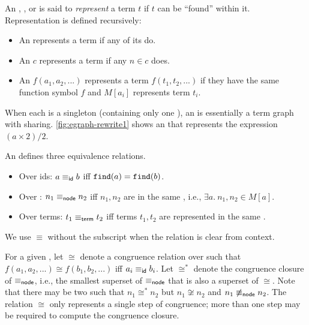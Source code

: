 \begin{definition}
  An \egraph, \eclass, or \enode is said to \textit{represent} a term $t$ if $t$ can be
    ``found'' within it. Representation is defined recursively:
  \begin{itemize}
    \item An \egraph represents a term if any of its \eclasses do.
    \item An \eclass $c$ represents a term if any \enode $n \in c$ does.
    \item An \enode $f(a_{1}, a_{2}, ...)$ represents a term $f(t_{1}, t_{2}, ...)$
          if they have the same function symbol $f$
          and \eclass $M[a_{i}]$ represents term $t_{i}$.
  \end{itemize}

  When each \eclass is a singleton (containing only one \enode),
    an \egraph is essentially a term graph with sharing.
  \autoref{fig:egraph-rewrite1} shows an \egraph that represents the
    expression $(a \times 2) / 2$.
\end{definition}

\begin{definition}[Equivalence]
  An \egraph defines three equivalence relations.
  \begin{itemize}
    \item Over \eclass ids: $a \equiv_{\sf id} b$ iff $\texttt{find}(a) = \texttt{find}(b)$.
    \item Over \enodes: $n_{1} \equiv_{\sf node} n_{2}$ iff \enodes $n_{1}, n_{2}$ are in the same \eclass,
          i.e., $\exists a.\ n_{1}, n_{2} \in M[a]$.
    \item Over terms: $t_{1} \equiv_{\sf term} t_{2}$ iff terms $t_{1}, t_{2}$ are represented in the same \eclass.
  \end{itemize}

  We use $\equiv$ without the subscript when the relation is clear from context.
\end{definition}

\begin{definition}[Congruence]
  For a given \egraph, let $\cong$ denote a congruence relation over \enodes such that
  ${f(a_{1}, a_{2}, ...) \cong f(b_{1}, b_{2}, ...)}$ iff $a_{i} \equiv_{\sf id} b_{i}$.
  Let $\cong^{*}$ denote the congruence closure of $\equiv_{\sf node}$,
   i.e., the smallest superset of $\equiv_{\sf node}$ that is also a superset of $\cong$.
  Note that there may be two \enodes such that
    $n_{1} \cong^{*} n_{2}$ but
    $n_{1} \not\cong n_{2}$ and
    $n_{1} \not\equiv_{\sf node} n_{2}$.
  The relation $\cong$ only represents a single step of congruence;
  more than one step may be required to compute the congruence closure.
\end{definition}

